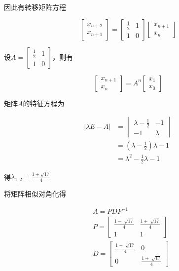 因此有转移矩阵方程

\begin{equation}
    \begin{bmatrix}
        x_{n+2} \\
        x_{n+1} 
    \end{bmatrix} =
    \begin{bmatrix}
        \frac{1}{2} & 1 \\
        1 & 0 
    \end{bmatrix}
    \begin{bmatrix}
        x_{n+1} \\
        x_n
    \end{bmatrix}
\end{equation}

设$A = \begin{bmatrix}
    \frac{1}{2} & 1 \\
    1 & 0 
\end{bmatrix}$，则有

\begin{equation}
    \begin{bmatrix}
        x_{n+1} \\
        x_{n} 
    \end{bmatrix} =
    A^n
    \begin{bmatrix}
        x_{1} \\
        x_0
    \end{bmatrix}
\end{equation}

矩阵$A$的特征方程为

\begin{equation}
    \begin{split}  
   |\lambda E - A | &= 
   \begin{vmatrix}
    \lambda - \frac{1}{2} & -1 \\
    -1 & \lambda 
   \end{vmatrix}
   \\
   &=(\lambda -\frac{1}{2})\lambda - 1\\
   &= \lambda ^ 2 - \frac{1}{2} \lambda  -1
\end{split}
\end{equation}

得$\lambda_{1,2} = \frac{1 \pm \sqrt{17} }{4} $

将矩阵相似对角化得

\begin{equation}
    \begin{aligned}
    &A = PDP^{-1} \\
    &P = \begin{bmatrix}
        \frac{1-\sqrt[]{17}}{4} & \frac{1+\sqrt[]{17}}{4} \\
        1 & 1 
    \end{bmatrix}
    \\
    &D=\begin{bmatrix}
        \frac{1-\sqrt[]{17}}{4} & 0 \\
        0 & \frac{1+\sqrt[]{17}}{4} 
    \end{bmatrix}
\end{aligned} 
\end{equation}

